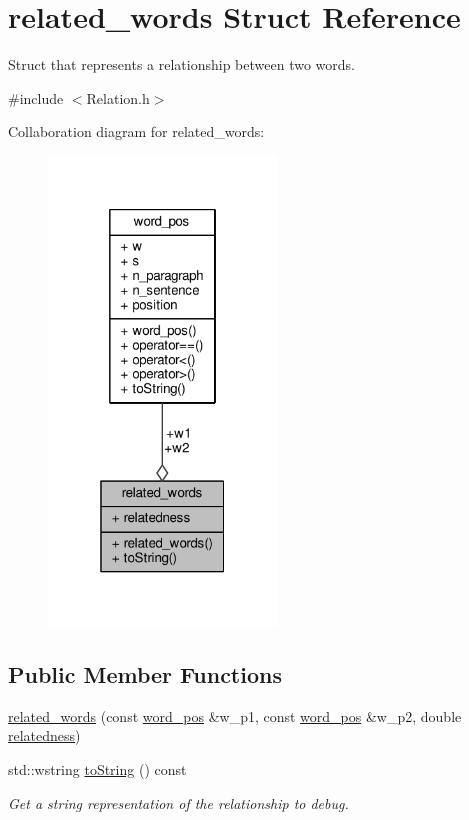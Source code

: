 \hypertarget{structrelated__words}{}\section{related\+\_\+words Struct Reference}
\label{structrelated__words}


Struct that represents a relationship between two words.  




{\ttfamily \#include $<$Relation.\+h$>$}



Collaboration diagram for related\+\_\+words\+:\nopagebreak
\begin{figure}[H]
\begin{center}
\leavevmode
\includegraphics[width=172pt]{structrelated__words__coll__graph}
\end{center}
\end{figure}
\subsection*{Public Member Functions}
\begin{DoxyCompactItemize}
\item 
\hyperlink{structrelated__words_a0f35724f6fcc5cad5666b7b32c3cd36f}{related\+\_\+words} (const \hyperlink{structword__pos}{word\+\_\+pos} \&w\+\_\+p1, const \hyperlink{structword__pos}{word\+\_\+pos} \&w\+\_\+p2, double \hyperlink{structrelated__words_aefbff0c852fe59008f43f2c921b42330}{relatedness})
\item 
std\+::wstring \hyperlink{structrelated__words_a4feeb3a32b398b9b1f31197431bd0002}{to\+String} () const 
\begin{DoxyCompactList}\small\item\em Get a string representation of the relationship to debug. \end{DoxyCompactList}\end{DoxyCompactItemize}
